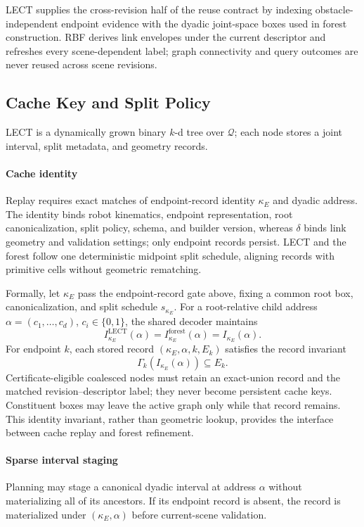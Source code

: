\documentclass[journal]{IEEEtran}
\newcommand{\rbf}{RBF}
\newcommand{\Q}{\ensuremath{\mathcal{Q}}}
\begin{document}
LECT supplies the cross-revision half of the reuse contract by indexing
obstacle-independent endpoint evidence with the dyadic joint-space boxes used
in forest construction. \rbf{} derives link envelopes under the current descriptor and
refreshes every scene-dependent label; graph connectivity and query outcomes
are never reused across scene revisions.

\subsection{Cache Key and Split Policy}\label{sec:lect_design}

LECT is a dynamically grown binary \(k\)-d tree over $\Q$; each node stores a
joint interval, split metadata, and geometry records.

\paragraph{Cache identity}
Replay requires exact matches of endpoint-record identity $\kappa_E$ and dyadic
address. The identity binds robot kinematics, endpoint representation, root
canonicalization, split policy, schema, and builder version, whereas $\delta$
binds link geometry and validation settings; only endpoint records persist.
LECT and the forest follow one deterministic midpoint split schedule, aligning
records with primitive cells without geometric rematching.

Formally, let $\kappa_E$ pass the endpoint-record gate above, fixing a common
root box, canonicalization, and split schedule $s_{\kappa_E}$. For a root-relative
child address $\alpha=(c_1,\ldots,c_d)$, $c_i\in\{0,1\}$, the shared decoder
maintains
\[
I_{\kappa_E}^{\mathrm{LECT}}(\alpha)
=I_{\kappa_E}^{\mathrm{forest}}(\alpha)=I_{\kappa_E}(\alpha).
\]
For endpoint $k$, each stored record $(\kappa_E,\alpha,k,E_k)$ satisfies the
record invariant
\[
\Gamma_k\!\left(I_{\kappa_E}(\alpha)\right)\subseteq E_k.
\]
Certificate-eligible coalesced nodes must retain an exact-union record and the
matched revision--descriptor label; they never become persistent cache keys.
Constituent boxes may leave the active graph only while that record remains. This
identity invariant, rather than geometric lookup, provides the interface
between cache replay and forest refinement.

\paragraph{Sparse interval staging}
Planning may stage a canonical dyadic interval at address $\alpha$ without
materializing all of its ancestors. If its endpoint record is absent, the record
is materialized under $(\kappa_E,\alpha)$ before current-scene validation.
\end{document}

